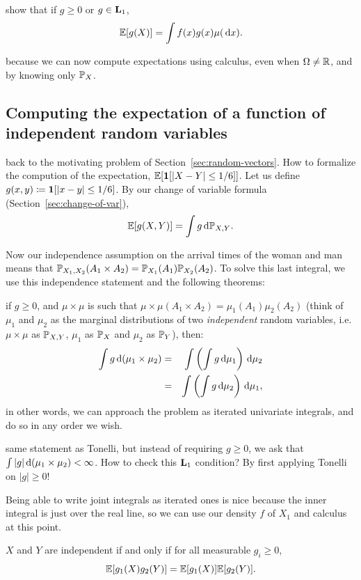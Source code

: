 \documentclass{article}
\begin{document}
 show that if $g \ge 0$ or $g \in \L_1$, 
\[ \E[g(X)] = \int f(x) g(x) \mu(\ud x). \]

 because we can now compute expectations using calculus, even when $\Omega \neq \R$, and by knowing only $\P_X$.


\subsection{Computing the expectation of a function of independent random variables}\label{sec:expectation-indep}

 back to the motivating problem of Section~\ref{sec:random-vectors}. How to formalize the compution of the expectation, $\E[\1[|X-Y| \le 1/6]]$. Let us define $g(x,y) \defeq \1[|x-y| \le 1/6]$. By our change of variable formula (Section~\ref{sec:change-of-var}), \[ \E[ g(X,Y) ] = \int g \ud \P_{X,Y}. \]

Now our independence assumption on the arrival times of the woman and man means that $\P_{X_1,X_2}(A_1 \times A_2) = \P_{X_1}(A_1) \P_{X_2}(A_2)$. To solve this last integral, we use this independence statement and the following theorems:

 if $g \ge 0$, and $\mu \times \mu$ is such that $\mu \times \mu(A_1 \times A_2) = \mu_1(A_1) \mu_2(A_2)$ (think of $\mu_1$ and $\mu_2$ as the marginal distributions of two \emph{independent} random variables, i.e. $\mu \times \mu$ as $\P_{X,Y}$, $\mu_1$ as $\P_X$ and $\mu_2$ as $\P_Y$), then:
\begin{eqnarray*}
\int g \ud(\mu_1 \times \mu_2) &=& \int \left( \int g \ud \mu_1 \right) \ud \mu_2 \\
&=& \int \left( \int g \ud \mu_2 \right) \ud \mu_1,
\end{eqnarray*}
in other words, we can approach the problem as iterated univariate integrals, and do so in any order we wish.

 same statement as Tonelli, but instead of requiring $g \ge 0$, we ask that $\int |g| \ud(\mu_1 \times \mu_2) < \infty$. How to check this ${\L}_1$ condition? By first applying Tonelli on $|g| \ge 0$!

\noindent Being able to write joint integrals as iterated ones is nice because the inner integral is just over the real line, so we can use our density $f$ of $X_1$ and calculus at this point.

 $X$ and $Y$ are independent if and only if for all measurable $g_i \ge 0$, \[ \E[g_1(X) g_2(Y) ] = \E[g_1(X)] \E[g_2(Y)]. \]
\end{document}
